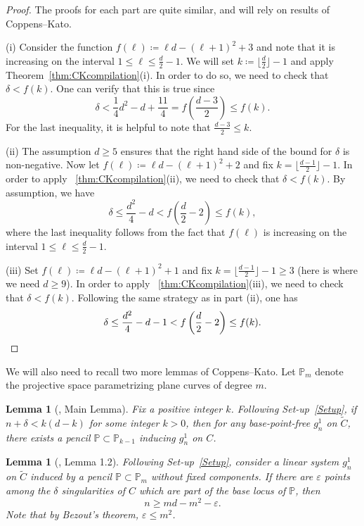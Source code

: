 \documentclass[fontsize=11pt,reqno]{amsart}
\newtheorem{lemma}[thm]{Lemma}
\theoremstyle{definition}
\theoremstyle{remark}
\newcommand{\tC}{\widetilde{C}}
\renewcommand{\P}{\mathbb{P}}
\begin{document}
\begin{proof}
    The proofs for each part are quite similar, and will rely on results of Coppens--Kato.

    (i) Consider the function $f(\ell) \coloneqq \ell d - (\ell+1)^{2}+3$ and note that it is increasing on the interval $1 \leq \ell \leq \frac{d}{2}-1$. We will set $k \coloneqq \lfloor \frac{d}{2} \rfloor - 1$ and apply Theorem~\ref{thm:CKcompilation}(i). In order to do so, we need to check that $\delta < f(k)$. One can verify that this is true since
    \[ \delta < \frac{1}{4} d^{2} - d + \frac{11}{4} = f\left( \frac{d-3}{2} \right) \leq f(k). \]
    For the last inequality, it is helpful to note that $\frac{d-3}{2} \leq k$.
    
    (ii) The assumption $d \geq 5$ ensures that the right hand side of the bound for $\delta$ is non-negative. Now let $f(\ell) \coloneqq \ell d - (\ell+1)^{2}+2$ and fix $k = \lfloor \frac{d-1}{2} \rfloor - 1$. In order to apply ~\cref{thm:CKcompilation}(ii), we need to check that $\delta < f(k)$. By assumption, we have
    \[ \delta \leq \frac{d^{2}}{4} - d < f\left( \frac{d}{2} - 2 \right) \leq f(k), \]
    where the last inequality follows from the fact that $f(\ell)$ is increasing on the interval $1 \leq \ell \leq \frac{d}{2}-1$. 

    (iii) Set $f(\ell) \coloneqq \ell d - (\ell+1)^{2}+1$ and fix $k = \lfloor \frac{d-1}{2} \rfloor - 1 \geq 3$ (here is where we need $d \geq 9$). In order to apply ~\cref{thm:CKcompilation}(iii), we need to check that $\delta < f(k)$. Following the same strategy as in part (ii), one has
    \[ \delta \leq \frac{d^{2}}{4} - d - 1 < f\left( \frac{d}{2} - 2 \right) \leq f(k). \qedhere \]
\end{proof}

We will also need to recall two more lemmas of Coppens--Kato. Let $\P_{m}$ denote the projective space parametrizing plane curves of degree $m$.

\begin{lemma}[\cite{CK91correction}, Main Lemma]\label{lemma:CKMain}
Fix a positive integer $k$. Following Set-up~\ref{Setup}, if $n+\delta < k (d - k)$ for some integer $k>0$, then for any base-point-free $g^1_n$ on $\tC$, there exists a pencil $\P \subset \P_{k-1}$ inducing $g^1_n$ on $C$.
\end{lemma}

\begin{lemma}[\cite{CK91}, Lemma 1.2]\label{lemma:CK1.2}
Following Set-up~\ref{Setup}, consider a linear system $g^1_n$ on $\tC$ induced by a pencil $\P \subset \P_{m}$ without fixed components. If there are $\varepsilon$ points among the $\delta$ singularities of $C$ which are part of the base locus of $\P$, then
\[ n\geq md-m^2-\varepsilon. \]
Note that by Bezout's theorem, $\varepsilon \leq m^{2}$.
\end{lemma}
\end{document}
